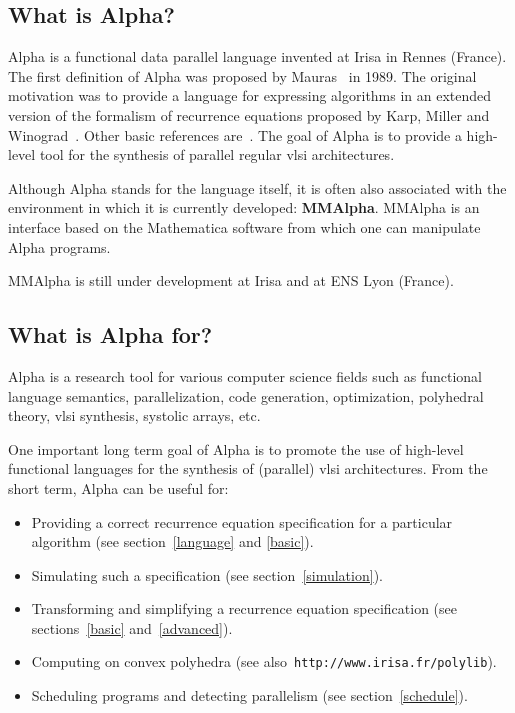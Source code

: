 \documentclass[12pt]{article}
\newcommand{\Alpha}{{\sc Alpha}}
\newcommand{\MMA}{{\sc MMAlpha}}
\newcommand{\irisa}{ Irisa}
\newcommand{\vlsi}{{\sc vlsi}}
\newcommand{\alfa}{\Alpha}
\newcommand{\mmalfa}{\MMA}
\newcommand{\mma}{{Mathematica}}
\newcommand{\polylib}{{\sc polylib}}
\begin{document}
\subsection*{What is \Alpha?}
\label{Whatis}
\nocite{Alpha97a,BQRR,Ris21,DupontQuRi95,DuRiRo97,QuRaRi96a,QuRaRi97a}
{\Alpha} is a functional data parallel 
language invented at 
{\irisa} in Rennes (France). 
The first definition of \alfa{} was proposed by Mauras~\cite{Mauras89} 
in 1989. The original motivation was to provide 
a language for expressing algorithms in an extended version of 
the formalism of recurrence equations
proposed by Karp, Miller and Winograd~\cite{KaMiWi67}. 
Other basic references are~\cite{Moldovan82,Quinton84c,Rajopadhye86}.
The goal of \alfa{} is to provide
a high-level tool for the synthesis of parallel regular {\vlsi} architectures.

Although {\Alpha} stands for the language itself, it is often also
associated with the environment in which it is currently developed:
{\bf {\MMA}}. {\MMA} is an interface based on the \mma{}
software from which one can manipulate {\Alpha} programs.

\mmalfa{} is still under development at \irisa{} and at ENS Lyon (France).

\subsection*{What is {\Alpha} for?}
\label{whatfor}
{\Alpha} is a research tool for 
various computer science fields such as functional language semantics,
parallelization, code generation, optimization, polyhedral theory,
{\vlsi} synthesis, systolic arrays, etc.

One important long term goal of \alfa{} is to promote the use of high-level 
functional languages for the synthesis of (parallel) {\vlsi}
architectures. From the short term, Alpha can be useful
for:
\begin{itemize}
\item Providing a correct recurrence equation specification for a particular 
algorithm (see section~\ref{language} and \ref{basic}).
\item Simulating such a specification (see section~\ref{simulation}).
\item Transforming and simplifying a recurrence equation specification (see 
sections~\ref{basic} and~\ref{advanced}).
\item Computing on convex polyhedra 
(see also~\texttt{{http://www.irisa.fr/polylib}}).
\index{polylib@\polylib}
\item Scheduling programs and detecting parallelism 
(see section~\ref{schedule}).
\end{itemize}
\end{document}
